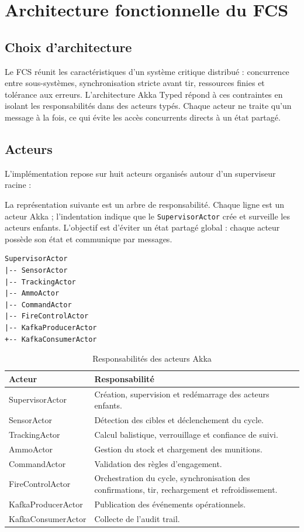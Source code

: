 \documentclass[11pt,a4paper]{report}
\begin{document}
\chapter{Architecture fonctionnelle du FCS}

\section{Choix d'architecture}
Le FCS réunit les caractéristiques d'un système critique distribué : concurrence entre sous-systèmes, synchronisation stricte avant tir, ressources finies et tolérance aux erreurs. L'architecture Akka Typed répond à ces contraintes en isolant les responsabilités dans des acteurs typés. Chaque acteur ne traite qu'un message à la fois, ce qui évite les accès concurrents directs à un état partagé.

\section{Acteurs}
L'implémentation repose sur huit acteurs organisés autour d'un superviseur racine :

La représentation suivante est un arbre de responsabilité. Chaque ligne est un acteur Akka ; l'indentation indique que le \texttt{SupervisorActor} crée et surveille les acteurs enfants. L'objectif est d'éviter un état partagé global : chaque acteur possède son état et communique par messages.

\begin{lstlisting}
SupervisorActor
|-- SensorActor
|-- TrackingActor
|-- AmmoActor
|-- CommandActor
|-- FireControlActor
|-- KafkaProducerActor
+-- KafkaConsumerActor
\end{lstlisting}

\begin{table}[H]
\centering
\caption{Responsabilités des acteurs Akka}
\begin{tabularx}{\textwidth}{lY}
\toprule
Acteur & Responsabilité \\
\midrule
SupervisorActor & Création, supervision et redémarrage des acteurs enfants. \\
SensorActor & Détection des cibles et déclenchement du cycle. \\
TrackingActor & Calcul balistique, verrouillage et confiance de suivi. \\
AmmoActor & Gestion du stock et chargement des munitions. \\
CommandActor & Validation des règles d'engagement. \\
FireControlActor & Orchestration du cycle, synchronisation des confirmations, tir, rechargement et refroidissement. \\
KafkaProducerActor & Publication des événements opérationnels. \\
KafkaConsumerActor & Collecte de l'audit trail. \\
\bottomrule
\end{tabularx}
\end{table}
\end{document}

